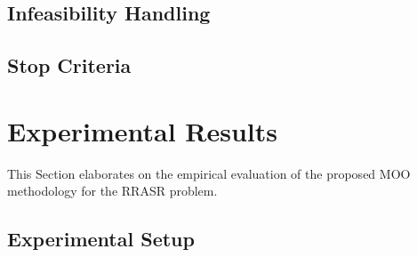 \documentclass[conference]{IEEEtran}
\begin{document}

\subsection{Infeasibility Handling}
\label{sec:Algorithms:Infeasibility}

\subsection{Stop Criteria}
\label{sec:Algorithms:StopCriteria}




\section{Experimental Results}
\label{sec:Experiments}

This Section elaborates on the empirical evaluation of the proposed MOO methodology for the RRASR problem.

\subsection{Experimental Setup}
\label{sec:Experiments:Setup:Scenarios}
\end{document}
